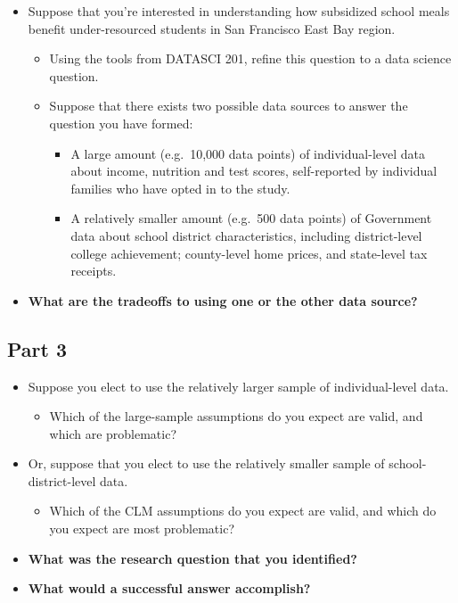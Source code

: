 \documentclass[
]{book}
\providecommand{\tightlist}{%
  \setlength{\itemsep}{0pt}\setlength{\parskip}{0pt}}
\theoremstyle{definition}
\theoremstyle{definition}
\theoremstyle{definition}
\theoremstyle{definition}
\theoremstyle{remark}
\begin{document}
\begin{itemize}
\tightlist
\item
  Suppose that you're interested in understanding how subsidized school meals benefit under-resourced students in San Francisco East Bay region.

  \begin{itemize}
  \tightlist
  \item
    Using the tools from DATASCI 201, refine this question to a data science question.
  \item
    Suppose that there exists two possible data sources to answer the question you have formed:

    \begin{itemize}
    \tightlist
    \item
      A large amount (e.g.~10,000 data points) of individual-level data about income, nutrition and test scores, self-reported by individual families who have opted in to the study.\\
    \item
      A relatively smaller amount (e.g.~500 data points) of Government data about school district characteristics, including district-level college achievement; county-level home prices, and state-level tax receipts.
    \end{itemize}
  \end{itemize}
\item
  \textbf{What are the tradeoffs to using one or the other data source?}\\
\end{itemize}

\subsection{Part 3}\label{part-3-1}

\begin{itemize}
\tightlist
\item
  Suppose you elect to use the relatively larger sample of individual-level data.

  \begin{itemize}
  \tightlist
  \item
    Which of the large-sample assumptions do you expect are valid, and which are problematic?
  \end{itemize}
\item
  Or, suppose that you elect to use the relatively smaller sample of school-district-level data.

  \begin{itemize}
  \tightlist
  \item
    Which of the CLM assumptions do you expect are valid, and which do you expect are most problematic?
  \end{itemize}
\item
  \textbf{What was the research question that you identified?}
\item
  \textbf{What would a successful answer accomplish?}
\end{itemize}
\end{document}

